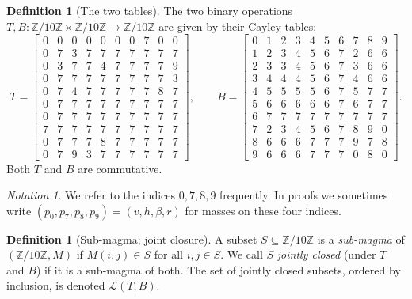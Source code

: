 \documentclass[11pt,reqno]{amsart}
\theoremstyle{plain}
\theoremstyle{definition}
\newtheorem{definition}[theorem]{Definition}
\theoremstyle{remark}
\newtheorem*{notation}{Notation}
\newcommand{\Z}{\mathbb{Z}}
\newcommand{\Zten}{\Z/10\Z}
\begin{document}
\begin{definition}[The two tables]\label{def:tables}
The two binary operations $T,B:\Zten\times\Zten\to\Zten$ are given
by their Cayley tables:
\[
T = \left[
\begin{array}{*{10}{c}}
0 & 0 & 0 & 0 & 0 & 0 & 0 & 7 & 0 & 0 \\
0 & 7 & 3 & 7 & 7 & 7 & 7 & 7 & 7 & 7 \\
0 & 3 & 7 & 7 & 4 & 7 & 7 & 7 & 7 & 9 \\
0 & 7 & 7 & 7 & 7 & 7 & 7 & 7 & 7 & 3 \\
0 & 7 & 4 & 7 & 7 & 7 & 7 & 7 & 8 & 7 \\
0 & 7 & 7 & 7 & 7 & 7 & 7 & 7 & 7 & 7 \\
0 & 7 & 7 & 7 & 7 & 7 & 7 & 7 & 7 & 7 \\
7 & 7 & 7 & 7 & 7 & 7 & 7 & 7 & 7 & 7 \\
0 & 7 & 7 & 7 & 8 & 7 & 7 & 7 & 7 & 7 \\
0 & 7 & 9 & 3 & 7 & 7 & 7 & 7 & 7 & 7
\end{array}
\right],\qquad
B = \left[
\begin{array}{*{10}{c}}
0 & 1 & 2 & 3 & 4 & 5 & 6 & 7 & 8 & 9 \\
1 & 2 & 3 & 4 & 5 & 6 & 7 & 2 & 6 & 6 \\
2 & 3 & 3 & 4 & 5 & 6 & 7 & 3 & 6 & 6 \\
3 & 4 & 4 & 4 & 5 & 6 & 7 & 4 & 6 & 6 \\
4 & 5 & 5 & 5 & 5 & 6 & 7 & 5 & 7 & 7 \\
5 & 6 & 6 & 6 & 6 & 6 & 7 & 6 & 7 & 7 \\
6 & 7 & 7 & 7 & 7 & 7 & 7 & 7 & 7 & 7 \\
7 & 2 & 3 & 4 & 5 & 6 & 7 & 8 & 9 & 0 \\
8 & 6 & 6 & 6 & 7 & 7 & 7 & 9 & 7 & 8 \\
9 & 6 & 6 & 6 & 7 & 7 & 7 & 0 & 8 & 0
\end{array}
\right].
\]
Both $T$ and $B$ are commutative.
\end{definition}

\begin{notation}
We refer to the indices $0,7,8,9$ frequently. In proofs we
sometimes write $(p_{0},p_{7},p_{8},p_{9})=(v,h,\beta,r)$ for
masses on these four indices.
\end{notation}

\begin{definition}[Sub-magma; joint closure]\label{def:submagma}
A subset $S\subseteq\Zten$ is a \emph{sub-magma} of $(\Zten,M)$ if
$M(i,j)\in S$ for all $i,j\in S$. We call $S$ \emph{jointly
closed} (under $T$ and $B$) if it is a sub-magma of both. The set
of jointly closed subsets, ordered by inclusion, is denoted
$\mathcal{L}(T,B)$.
\end{definition}
\end{document}
